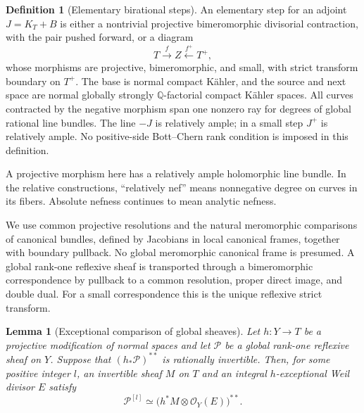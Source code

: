\documentclass[11pt,letterpaper]{article}
\newcommand{\Q}{\mathbb{Q}}
\newcommand{\OO}{\mathcal{O}}
\newtheorem{lemma}[theorem]{Lemma}
\theoremstyle{definition}
\newtheorem{definition}[theorem]{Definition}
\theoremstyle{remark}
\begin{document}
\begin{definition}[Elementary birational steps]
\label{bir:elementary}
An elementary step for an adjoint $J=K_T+B$ is either a nontrivial
projective bimeromorphic divisorial contraction, with the pair pushed
forward, or a diagram
\begin{equation}
 T\xrightarrow{f} Z\xleftarrow{f^+}T^+,
 \label{bir:small-diagram}
\end{equation}
whose morphisms are projective, bimeromorphic, and small, with strict
transform boundary on $T^+$.  The base is normal compact K\"ahler, and
the source and next space are normal globally strongly $\Q$-factorial
compact K\"ahler spaces.  All curves contracted by the negative
morphism span one nonzero ray for degrees of global rational line
bundles.  The line $-J$ is relatively ample; in a small step $J^+$ is
relatively ample.  No positive-side Bott--Chern rank condition is
imposed in this definition.
\end{definition}

A projective morphism here has a relatively ample holomorphic line
bundle.  In the relative constructions, ``relatively nef'' means
nonnegative degree on curves in its fibers.  Absolute nefness continues
to mean analytic nefness.

We use common projective resolutions and the natural meromorphic
comparisons of canonical bundles, defined by Jacobians in local
canonical frames, together with boundary pullback.  No global
meromorphic canonical frame is presumed.  A global rank-one reflexive
sheaf is transported through a bimeromorphic correspondence by
pullback to a common resolution, proper direct image, and double dual.
For a small correspondence this is the unique reflexive strict
transform.

\begin{lemma}[Exceptional comparison of global sheaves]
\label{bir:sheaf-comparison}
Let $h:Y\to T$ be a projective modification of normal spaces and let
$\mathcal P$ be a global rank-one reflexive sheaf on $Y$.  Suppose that
$(h_*\mathcal P)^{**}$ is rationally invertible.  Then, for some positive
integer $l$, an invertible sheaf $M$ on $T$ and an integral
$h$-exceptional Weil divisor $E$ satisfy
\begin{equation}
 \mathcal P^{[l]}\simeq
 \bigl(h^*M\otimes\OO_Y(E)\bigr)^{**}.
 \label{bir:exceptional-sheaf}
\end{equation}
\end{lemma}
\end{document}
